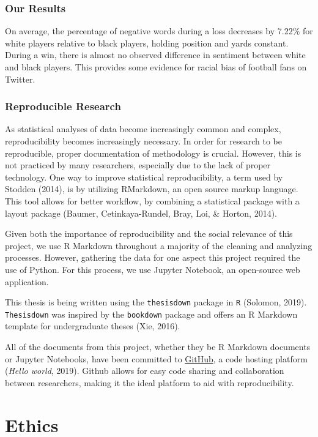\documentclass[12pt,twoside]{reedthesis}
\begin{document}
\subsection{Our Results}\label{our-results}

On average, the percentage of negative words during a loss decreases by
7.22\% for white players relative to black players, holding position and
yards constant. During a win, there is almost no observed difference in
sentiment between white and black players. This provides some evidence
for racial bias of football fans on Twitter.

\subsection{Reproducible Research}\label{reproducible-research}

As statistical analyses of data become increasingly common and complex,
reproducibility becomes increasingly necessary. In order for research to
be reproducible, proper documentation of methodology is crucial.
However, this is not practiced by many researchers, especially due to
the lack of proper technology. One way to improve statistical
reproducibility, a term used by Stodden (2014), is by utilizing
RMarkdown, an open source markup language. This tool allows for better
workflow, by combining a statistical package with a layout package
(Baumer, Cetinkaya-Rundel, Bray, Loi, \& Horton, 2014).

Given both the importance of reproducibility and the social relevance of
this project, we use R Markdown throughout a majority of the cleaning
and analyzing processes. However, gathering the data for one aspect this
project required the use of Python. For this process, we use Jupyter
Notebook, an open-source web application.

This thesis is being written using the \texttt{thesisdown} package in
\texttt{R} (Solomon, 2019). \texttt{Thesisdown} was inspired by the
\texttt{bookdown} package and offers an R Markdown template for
undergraduate theses (Xie, 2016).

All of the documents from this project, whether they be R Markdown
documents or Jupyter Notebooks, have been committed to
\href{https://github.com/jalvord1/nfl_sentiment}{GitHub}, a code hosting
platform (\emph{Hello world}, 2019). Github allows for easy code sharing
and collaboration between researchers, making it the ideal platform to
aid with reproducibility.

\chapter{Ethics}\label{ethics}
\end{document}
